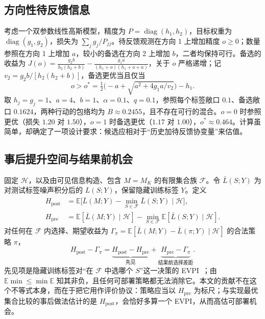 \documentclass[runningheads]{llncs}
\begin{document}
\subsection{方向性待反馈信息}
考虑一个双参数线性高斯模型，精度为 $P=\operatorname{diag}(h_1,h_2)$，目标权重为 $\operatorname{diag}(g_1,g_2)$，损失为 $\sum_jg_j/P_{jj}$。待反馈观测在方向 1 上增加精度 $o\ge0$；数量参照在方向 1 上增加 $a$，较小的备选在方向 2 上增加 $b$，二者均保持可行。备选的收益为 $J(o)=\frac{g_2b}{h_2(h_2+b)}-\frac{g_1a}{(h_1+o)(h_1+o+a)}$，关于 $o$ 严格递增；记 $v_2=g_2b/[h_2(h_2+b)]$，备选更优当且仅当
\begin{equation}
 o>o^*=\tfrac12\big(-a+\sqrt{a^2+4g_1a/v_2}\big)-h_1 .\label{eq:threshold}
\end{equation}
取 $h_j=g_j=1$、$a=4$、$b=1$、$\alpha=0.1$、$q=0.1$，参照每个标签敞口 $0.1$、备选敞口 $0.1624$，两种行动的包络均为 $B\approx0.2455$，且不存在可行的混合。$o=0$ 时参照更优（损失 $1.20$ 对 $1.50$），$o=1$ 时备选更优（$1.17$ 对 $1.00$），$o^*\approx0.464$。计算虽简单，却确定了一项设计要求：候选应相对于“历史加待反馈协变量”来估值。

\subsection{事后提升空间与结果前机会}
\label{sec:opportunity}
固定 $\mathcal H$，以及由可见信息构造、包含 $M=M_K$ 的有限集合族 $\mathcal F$。令 $\bar L(S;Y)$ 为对测试标签噪声积分后的 $L(S;Y)$，保留隐藏训练标签 $Y$。定义
\begin{align}
 H_{\mathrm{post}}&=\mathbb E\big[\bar L(M;Y)-\min_{S\in\mathcal F}\bar L(S;Y)\mid\mathcal H\big],\\
 H_{\mathrm{pre}}&=\mathbb E[\bar L(M;Y)\mid\mathcal H]-\min_{S\in\mathcal F}\mathbb E[\bar L(S;Y)\mid\mathcal H].
\end{align}
对任何在 $\mathcal F$ 内选择、期望收益为 $\Gamma_\pi=\mathbb E[\bar L(M;Y)-\bar L(\pi;Y)\mid\mathcal H]$ 的合法策略 $\pi$，
\begin{equation}
 H_{\mathrm{post}}-\Gamma_\pi=\underbrace{H_{\mathrm{post}}-H_{\mathrm{pre}}}_{\text{先见}}+\underbrace{H_{\mathrm{pre}}-\Gamma_\pi}_{\text{结果前选择差距}} .\label{eq:opportunity}
\end{equation}
先见项是隐藏训练标签对“在 $\mathcal F$ 中选哪个 $S$”这一决策的 EVPI~\cite{howard1966information,raiffa1961applied}；由 $\mathbb E\min\le\min\mathbb E$ 知其非负，且任何可部署策略都无法消除它。本文的贡献不在这个不等式本身，而在于把它用作评价协议：策略应当以 $H_{\mathrm{pre}}$ 为标尺；与实现最优集合比较的事后做法估计的是 $H_{\mathrm{post}}$，会恰好多算一个 EVPI，从而高估可部署机会。
\end{document}
